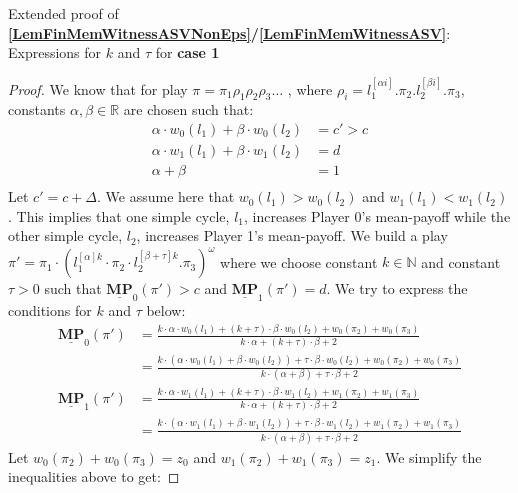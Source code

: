 \begin{lemma}
\label{LemExtProofOfFinMemforASV}
Extended proof of \textbf{\cref{LemFinMemWitnessASVNonEps}/\cref{LemFinMemWitnessASV}}: Expressions for $k$ and $\tau$ for \textbf{case 1}
\end{lemma}
\begin{proof}
We know that for play $\pi = \pi_1\rho_1\rho_2\rho_3\dots$ , where $\rho_i = l_1^{[\alpha i]}.\pi_2.l_2^{[\beta i]}.\pi_3$, constants $\alpha, \beta \in \mathbb{R}$ are chosen such that: 
\begin{align*}
    \alpha \cdot w_0(l_1) + \beta \cdot w_0(l_2) &= c' > c \\
    \alpha \cdot w_1(l_1) + \beta \cdot w_1(l_2) &= d \\
    \alpha + \beta &= 1 \\
\end{align*}
Let $c' = c + \Delta$. We assume here that $w_0(l_1) > w_0(l_2)$ and $w_1(l_1) < w_1(l_2)$. This implies that one simple cycle, $l_1$, increases Player 0's mean-payoff while the other simple cycle, $l_2$, increases Player 1's mean-payoff. We build a play $\pi' = \pi_1 \cdot (l_1^{[\alpha]k} \cdot \pi_2 \cdot l_2^{[\beta+\tau]k}.\pi_3)^{\omega}$ where we choose constant $k \in \mathbb{N}$ and constant $\tau > 0$ such that $\underline{\mathbf{MP}}_0(\pi') > c$ and $\underline{\mathbf{MP}}_1(\pi') = d$. We try to express the conditions for $k$ and $\tau$ below:
\begin{align*}
    \underline{\mathbf{MP}}_0(\pi') &= \frac{k\cdot\alpha\cdot w_0(l_1) + (k + \tau) \cdot \beta \cdot w_0(l_2) + w_0(\pi_2) + w_0(\pi_3)}{k\cdot\alpha + (k+\tau)\cdot\beta + 2}\\
    &= \frac{k\cdot(\alpha\cdot w_0(l_1) + \beta \cdot w_0(l_2)) + \tau \cdot \beta \cdot w_0(l_2) + w_0(\pi_2) + w_0(\pi_3)}{k\cdot(\alpha + \beta) + \tau\cdot\beta + 2}\\
    \underline{\mathbf{MP}}_1(\pi') &= \frac{k\cdot\alpha\cdot w_1(l_1) + (k + \tau) \cdot \beta \cdot w_1(l_2) + w_1(\pi_2) + w_1(\pi_3)}{k\cdot\alpha + (k+\tau)\cdot\beta + 2}\\
    &= \frac{k\cdot(\alpha\cdot w_1(l_1) + \beta \cdot w_1(l_2)) + \tau \cdot \beta \cdot w_1(l_2) + w_1(\pi_2) + w_1(\pi_3)}{k\cdot(\alpha + \beta) + \tau\cdot\beta + 2}
\end{align*}
Let $w_0(\pi_2) + w_0(\pi_3) = z_0$ and $w_1(\pi_2) + w_1(\pi_3) = z_1$. We simplify the inequalities above to get:


\end{proof}
